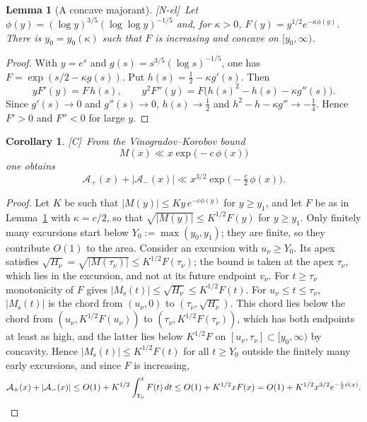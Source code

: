 \documentclass[11pt]{amsart}
\numberwithin{equation}{section}
\theoremstyle{plain}
\newtheorem{lemma}[theorem]{Lemma}
\newtheorem{corollary}[theorem]{Corollary}
\theoremstyle{definition}
\theoremstyle{remark}
\newcommand{\Ms}{M_{\mathrm{s}}}
\newcommand{\Ap}{\mathcal{A}_{+}}
\newcommand{\Am}{\mathcal{A}_{-}}
\newcommand{\tagNE}{\textup{[N-el]}}
\newcommand{\tagC}{\textup{[C]}}
\begin{document}
\begin{lemma}[A concave majorant]
\label{lem:concave-majorant}
\tagNE\ Let $\phi(y)=(\log y)^{3/5}(\log\log y)^{-1/5}$ and, for $\kappa>0$,
$F(y)=y^{1/2}e^{-\kappa\phi(y)}$. There is $y_0=y_0(\kappa)$ such that $F$
is increasing and concave on $[y_0,\infty)$.
\end{lemma}

\begin{proof}
With $y=e^s$ and $g(s)=s^{3/5}(\log s)^{-1/5}$, one has
$F=\exp(s/2-\kappa g(s))$. Put $h(s)=\frac12-\kappa g'(s)$. Then
\[
yF'(y)=F\,h(s),\qquad
y^2F''(y)=F\bigl(h(s)^2-h(s)-\kappa g''(s)\bigr).
\]
Since $g'(s)\to0$ and $g''(s)\to0$, $h(s)\to\frac12$ and
$h^2-h-\kappa g''\to-\frac14$. Hence $F'>0$ and $F''<0$ for large $y$.
\end{proof}

\begin{corollary}
\label{cor:uncond}
\tagC\ From the Vinogradov--Korobov bound \cite{Walfisz1963}
\begin{equation}
\label{eq:VK_M}
  M(x)\ll x\exp\bigl(-c\,\phi(x)\bigr)
\end{equation}
one obtains
\begin{equation}
\label{eq:uncond_area}
  \Ap(x)+|\Am(x)|\ll x^{3/2}\exp\bigl(-\tfrac c2\,\phi(x)\bigr).
\end{equation}
\end{corollary}

\begin{proof}
Let $K$ be such that $|M(y)|\le Ky\,e^{-c\phi(y)}$ for $y\ge y_1$, and let
$F$ be as in Lemma~\ref{lem:concave-majorant} with $\kappa=c/2$, so that
$\sqrt{|M(y)|}\le K^{1/2}F(y)$ for $y\ge y_1$. Only finitely many excursions
start below $Y_0:=\max(y_0,y_1)$; they are finite, so they contribute
$O(1)$ to the area. Consider an excursion with $u_\nu\ge Y_0$. Its apex
satisfies $\sqrt{H_\nu}=\sqrt{|M(\tau_\nu)|}\le K^{1/2}F(\tau_\nu)$; the
bound is taken at the apex $\tau_\nu$, which lies in the excursion, and not
at its future endpoint $v_\nu$. For $t\ge\tau_\nu$ monotonicity of $F$ gives
$|\Ms(t)|\le\sqrt{H_\nu}\le K^{1/2}F(t)$. For $u_\nu\le t\le\tau_\nu$,
$|\Ms(t)|$ is the chord from $(u_\nu,0)$ to $(\tau_\nu,\sqrt{H_\nu})$. This
chord lies below the chord from $(u_\nu,K^{1/2}F(u_\nu))$ to
$(\tau_\nu,K^{1/2}F(\tau_\nu))$, which has both endpoints at least as high,
and the latter lies below $K^{1/2}F$ on $[u_\nu,\tau_\nu]\subset[y_0,\infty)$
by concavity. Hence $|\Ms(t)|\le K^{1/2}F(t)$ for all $t\ge Y_0$ outside the
finitely many early excursions, and since $F$ is increasing,
\[
\Ap(x)+|\Am(x)|\le O(1)+K^{1/2}\int_{Y_0}^xF(t)\,dt
\le O(1)+K^{1/2}xF(x)=O(1)+K^{1/2}x^{3/2}e^{-\frac c2\phi(x)}.
\qedhere
\]
\end{proof}
\end{document}
